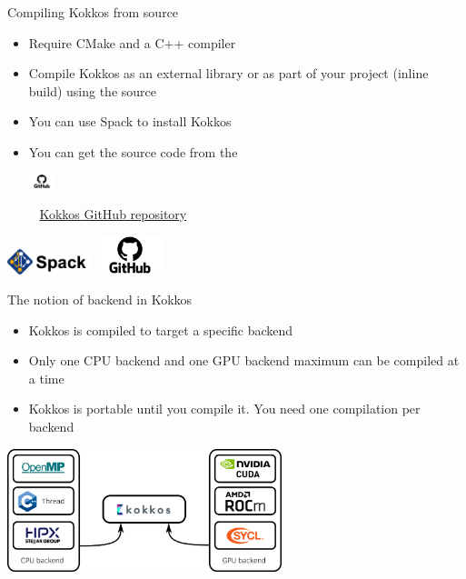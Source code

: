 \documentclass[aspectratio=169]{beamer}
\newcommand{\githublink}[2][2em]{%
    \hspace{-0.25em}%
    \parbox[c][#1][c]{#1}{%
        \includegraphics[width=#1]{GitHub-logo.png}%
    }%
    \hspace{-0.25em}%
    ~%
    #2%
}
\begin{document}

\begin{frame}{Compiling Kokkos from source}
    \begin{itemize}
        \item Require CMake and a C++ compiler
        \item Compile Kokkos as an external library or as part of your project (inline build) using the source
        \item You can use Spack to install Kokkos
        \item You can get the source code from the \githublink{\href{https://github.com/kokkos/kokkos}{Kokkos GitHub repository}}
    \end{itemize}
    \begin{center}
        \includegraphics[height=2em]{spack.png}%
        \hspace{1em}%
        \includegraphics[height=3em]{GitHub-logo.png}
    \end{center}
\end{frame}


\begin{frame}{The notion of backend in Kokkos}
    \begin{itemize}
        \item Kokkos is compiled to target a specific backend
        \item Only one CPU backend and one GPU backend maximum can be compiled at a time
        \item Kokkos is portable until you compile it. You need one compilation per backend
    \end{itemize}
    \begin{center}
        \includegraphics[width=0.6\textwidth]{kokkos_backend.png}
    \end{center}
\end{frame}
\end{document}
